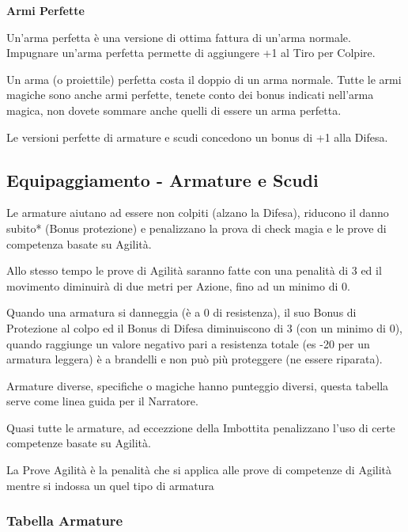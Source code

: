 \documentclass[a4paper,11pt,twoside,openany]{book}
\begin{document}
\medskip

\textbf{Armi Perfette}

Un'arma perfetta è una versione di ottima fattura di un'arma normale.
Impugnare un'arma perfetta permette di aggiungere +1 al Tiro per Colpire.

Un arma (o proiettile) perfetta costa il doppio di un arma normale.
Tutte le armi magiche sono anche armi perfette, tenete conto dei bonus 	indicati nell'arma magica, non dovete sommare anche quelli di essere un arma perfetta.

Le versioni perfette di armature e scudi concedono un bonus di +1 alla Difesa.



\pagebreak

\subsection{Equipaggiamento - Armature e Scudi}

\label{equipaggiamento---armature-e-scudi}

Le armature aiutano ad essere non colpiti (alzano la Difesa), riducono il danno subito{*} (Bonus protezione) e penalizzano la prova di check magia e le prove di competenza basate su Agilità.

Allo stesso tempo le prove di Agilità saranno fatte con una penalità di 3 ed il movimento diminuirà di due metri per Azione, fino ad un minimo di 0.

Quando una armatura si danneggia (è a 0 di resistenza), il suo Bonus di Protezione al colpo ed il Bonus di Difesa diminuiscono di 3 (con un minimo di 0), quando raggiunge un valore negativo pari a resistenza totale (es -20 per un armatura leggera) è a brandelli e non può più proteggere (ne essere riparata).

Armature diverse, specifiche o magiche hanno punteggio diversi, questa tabella serve come linea guida per il Narratore.

Quasi tutte le armature, ad eccezzione della Imbottita penalizzano l'uso di certe competenze basate su Agilità.

La Prove Agilità è la penalità che si applica alle prove di competenze di Agilità mentre si indossa un quel tipo di armatura

\subsubsection{Tabella Armature}
\medskip
\end{document}
